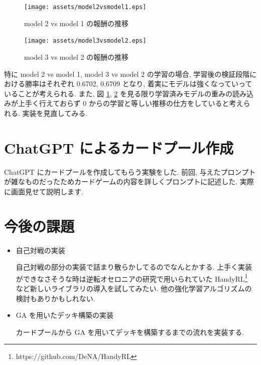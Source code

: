 \documentclass{jarticle}     %
\begin{document}
\begin{figure}[ht]
  \centering
  \texttt{[image: assets/model2vsmodel1.eps]}
  \vspace{-0.3cm}
  \caption{model 2 vs model 1 の報酬の推移}
  \label{fig:model21}
\end{figure}

\begin{figure}[ht]
  \centering
  \texttt{[image: assets/model3vsmodel2.eps]}
  \vspace{-0.3cm}
  \caption{model 3 vs model 2 の報酬の推移}
  \label{fig:model32}
\end{figure}

特に model 2 vs model 1, model 3 vs model 2 の学習の場合, 学習後の検証段階における勝率はそれぞれ 0.6702, 0.6709 となり, 着実にモデルは強くなっていっていることが考えられる.
また, 図 \ref{fig:model21}, \ref{fig:model32} を見る限り学習済みモデルの重みの読み込みが上手く行えておらず 0 からの学習と等しい推移の仕方をしていると考えられる. 実装を見直してみる.

\section{ChatGPT によるカードプール作成}

ChatGPT にカードプールを作成してもらう実験をした. 前回, 与えたプロンプトが雑なものだったためカードゲームの内容を詳しくプロンプトに記述した. 実際に画面見せて説明します.

\section{今後の課題}
\begin{itemize}
  \item 自己対戦の実装
  \par
  自己対戦の部分の実装で詰まり散らかしてるのでなんとかする. 上手く実装ができなさそうな時は逆転オセロニアの研究で用いられていた HandyRL\footnote[1]{https://github.com/DeNA/HandyRL} など新しいライブラリの導入を試してみたい. 他の強化学習アルゴリズムの検討もありかもしれない.

  \item GA を用いたデッキ構築の実装
  \par
  カードプールから GA を用いてデッキを構築するまでの流れを実装する. 
\end{itemize}





\end{document}
